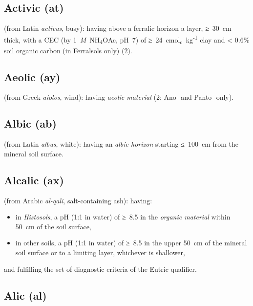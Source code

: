 \documentclass[
  letterpaper,
  DIV=11,
  numbers=noendperiod]{scrreprt}
\providecommand{\tightlist}{%
  \setlength{\itemsep}{0pt}\setlength{\parskip}{0pt}}\usepackage{longtable,booktabs,array}
\begin{document}
\hypertarget{activic-at}{%
\subsection{Activic (at)}\label{activic-at}}

(from Latin \emph{activus}, busy): having above a ferralic horizon a
layer, ≥~30~cm thick, with a CEC (by 1~\emph{M}~NH\textsubscript{4}OAc,
pH~7) of ≥~24~cmol\textsubscript{c}~kg\textsuperscript{-1} clay and
\textless{} 0.6\% soil organic carbon (in Ferralsols only) (2).

\hypertarget{aeolic-ay}{%
\subsection{Aeolic (ay)}\label{aeolic-ay}}

(from Greek \emph{aiolos}, wind): having \emph{aeolic material} (2: Ano-
and Panto- only).

\hypertarget{albic-ab}{%
\subsection{Albic (ab)}\label{albic-ab}}

(from Latin \emph{albus}, white): having an \emph{albic horizon}
starting ≤~100~cm from the mineral soil surface.

\hypertarget{alcalic-ax}{%
\subsection{Alcalic (ax)}\label{alcalic-ax}}

(from Arabic \emph{al-qali}, salt-containing ash): having:

\begin{itemize}
\tightlist
\item
  in \emph{Histosols}, a pH (1:1 in water) of ≥~8.5 in the \emph{organic
  material} within 50~cm of the soil surface,
\item
  in other soils, a pH (1:1 in water) of ≥~8.5 in the upper 50~cm of the
  mineral soil surface or to a limiting layer, whichever is shallower,
\end{itemize}

and fulfilling the set of diagnostic criteria of the Eutric qualifier.

\hypertarget{alic-al}{%
\subsection{Alic (al)}\label{alic-al}}
\end{document}
